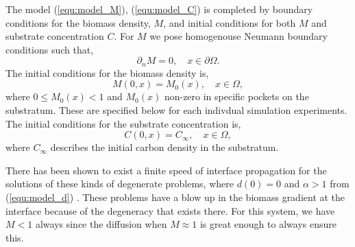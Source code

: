 The model (\ref{equ:model_M}), (\ref{equ:model_C}) is completed by boundary conditions for the biomass density, $M$, and initial conditions for both $M$ and substrate concentration $C$.
For $M$ we pose homogenouse Neumann boundary conditions such that,
\begin{equation} 
  \partial_n M = 0, \quad x \in \partial \Omega.
\end{equation}
The initial conditions for the biomass density is,
\begin{equation}
  M(0,x) = M_0(x), \quad x \in \Omega,
\end{equation}
where $0 \le M_0(x) < 1$ and $M_0(x)$ non-zero in specific pockets on the substratum. 
These are specified below for each indivdual simulation experiments.
The initial conditions for the substrate concentration is,
\begin{equation}
  C(0,x) = C_{\infty}, \quad x \in \Omega,
\end{equation}
where $C_{\infty}$ describes the initial carbon density in the substratum.

There has been shown to exist a finite speed of interface propagation for the solutions of these kinds of degenerate problems, where $d(0) = 0$ and $\alpha >1$ from (\ref{equ:model_d}) \citep{jalbert2014numerical}.
These problems have a blow up in the biomass gradient at the interface because of the degeneracy that exists there.
For this system, we have $M < 1$ always since the diffusion when $M \approx 1$ is great enough to always ensure this.

